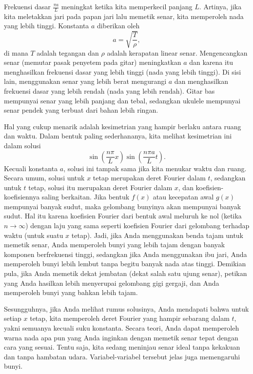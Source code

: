 Frekuensi dasar $\frac{\pi a}{L}$ meningkat ketika kita memperkecil panjang $L$.  Artinya, jika
kita meletakkan jari pada papan jari lalu memetik senar, kita memperoleh nada yang lebih
tinggi.  Konstanta $a$ diberikan oleh
\begin{equation*}
a = \sqrt{\frac{T}{\rho}} ,
\end{equation*}
di mana $T$ adalah tegangan dan $\rho$ adalah kerapatan linear senar.
Mengencangkan senar (memutar pasak penyetem pada gitar) meningkatkan $a$ dan
karena itu menghasilkan frekuensi dasar yang lebih tinggi (nada yang lebih tinggi).
Di sisi lain, menggunakan senar yang lebih berat 
mengurangi $a$ dan menghasilkan frekuensi dasar yang lebih rendah (nada yang lebih rendah).
Gitar bas mempunyai senar yang lebih panjang dan tebal, sedangkan ukulele mempunyai senar pendek
yang terbuat dari bahan lebih ringan.

Hal yang cukup menarik adalah kesimetrian yang hampir berlaku antara ruang dan waktu.
Dalam bentuk paling sederhananya, kita melihat kesimetrian ini dalam solusi
\begin{equation*}
\sin \left( \frac{n \pi}{L} x \right)
\sin \left( \frac{n \pi a}{L} t \right)  .
\end{equation*}
Kecuali konstanta $a$, solusi ini tampak sama jika kita
menukar waktu dan ruang.
Secara umum, solusi untuk $x$ tetap merupakan deret Fourier dalam $t$, sedangkan untuk
$t$ tetap, solusi itu merupakan deret Fourier dalam $x$, dan koefisien-koefisiennya saling berkaitan.
Jika bentuk $f(x)$ atau kecepatan awal $g(x)$ mempunyai banyak sudut, maka
gelombang bunyinya akan mempunyai banyak sudut.  Hal itu karena koefisien Fourier
dari bentuk awal meluruh ke nol (ketika $n \to \infty$) dengan laju yang sama seperti koefisien Fourier
dari gelombang terhadap waktu (untuk suatu $x$ tetap).  Jadi, jika Anda menggunakan benda tajam untuk
memetik senar, Anda memperoleh bunyi yang lebih tajam dengan banyak komponen
berfrekuensi tinggi, sedangkan jika Anda menggunakan ibu jari, Anda memperoleh bunyi lebih lembut tanpa
begitu banyak nada atas tinggi.
Demikian pula, jika Anda memetik dekat jembatan (dekat
salah satu ujung senar), petikan yang Anda hasilkan
lebih menyerupai gelombang gigi gergaji, dan Anda memperoleh bunyi yang bahkan
lebih tajam.

Sesungguhnya, jika Anda melihat rumus solusinya, Anda mendapati bahwa untuk setiap
$x$ tetap, kita memperoleh deret Fourier yang hampir sebarang dalam $t$, yakni semuanya
kecuali suku konstanta.  Secara teori, Anda dapat memperoleh warna nada apa pun yang Anda inginkan
dengan memetik senar tepat dengan cara yang sesuai.
Tentu saja, kita sedang meninjau senar ideal tanpa kekakuan dan tanpa hambatan
udara.  Variabel-variabel tersebut jelas juga memengaruhi bunyi.

